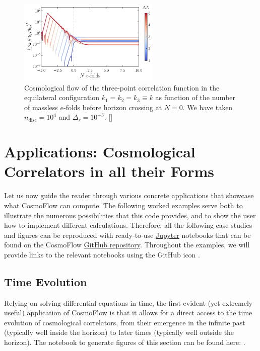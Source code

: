 \documentclass[11pt]{article}
\numberwithin{equation}{section} %
\begin{document}
\begin{figure}[h!]
  \centering
  \includegraphics[width=0.6\textwidth]{Figures/Masslessdphi3_MasslessEfolds.pdf}
  \vspace*{0.2cm}
  \caption{Cosmological flow of the three-point correlation function in the equilateral configuration $k_1=k_2=k_3 \equiv k$ as function of the number of massless $e$-folds before horizon crossing at $N=0$. We have taken $n_{\text{disc}} = 10^4$ and $\Delta_r = 10^{-3}$. [\href{https://github.com/deniswerth/CosmoFlow/blob/main/CosmoFlow/Massless_dphi3/PossibleIssues.ipynb}{\faGithub}]}
  \label{fig: Masslessdphi3 massless efolds}
\end{figure}


\section{Applications: Cosmological Correlators in all their Forms}
\label{sec: Applications}

Let us now guide the reader through various concrete applications that showcase what \textsf{CosmoFlow} can compute. The following worked examples serve both to illustrate the numerous possibilities that this code provides, and to show the user how to implement different calculations. Therefore, all the following case studies and figures can be reproduced with ready-to-use \href{https://jupyter.org/}{\textsf{Jupyter}} notebooks that can be found on the \textsf{CosmoFlow} \href{https://github.com/deniswerth/CosmoFlow/tree/main}{GitHub repository}. Throughout the examples, we will provide links to the relevant notebooks using the GitHub icon \faGithub.


\subsection{Time Evolution}

Relying on solving differential equations in time, the first evident (yet extremely useful) application of \textsf{CosmoFlow} is that it allows for a direct access to the time evolution of cosmological correlators, from their emergence in the infinite past (typically well inside the horizon) to later times (typically well outside the horizon). The notebook to generate figures of this section can be found here: \href{https://github.com/deniswerth/CosmoFlow/blob/main/CosmoFlow/PhiPsi/TimeEvolution.ipynb}{\faGithub}.
\end{document}
